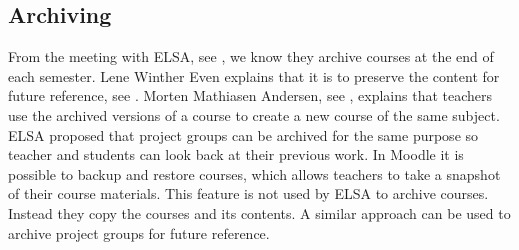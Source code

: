 \subsection{Archiving}
\label{sub:analysarchiving}
From the meeting with ELSA, see , we know they archive courses at the end of each semester. 
Lene Winther Even explains that it is to preserve the content for future reference, see . 
Morten Mathiasen Andersen, see , explains that teachers use the archived versions of a course to create a new course of the same subject. 
ELSA proposed that project groups can be archived for the same purpose so teacher and students can look back at their previous work.
In Moodle it is possible to backup and restore courses, which allows teachers to take a snapshot of their course materials. 
This feature is not used by ELSA to archive courses.
Instead they copy the courses and its contents.
A similar approach can be used to archive project groups for future reference. 

